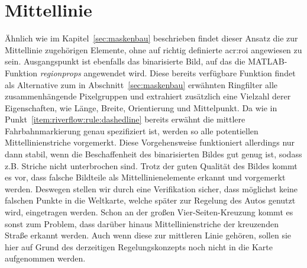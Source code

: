 \section{Mittellinie \dcfirstauthorshort}
\label{ssec:fahrspurerkennung:riverflow:mittellinie}
Ähnlich wie im Kapitel~\ref{sec:maskenbau} beschrieben findet dieser Ansatz die zur Mittellinie zugehörigen Elemente, ohne auf richtig definierte \gls{acr:roi} angewiesen zu sein. Ausgangspunkt ist ebenfalls das binarisierte Bild, auf das die MATLAB-Funktion \emph{regionprops} angewendet wird. Diese bereits verfügbare Funktion findet als Alternative zum in Abschnitt~\ref{sec:maskenbau} erwähnten \glqq Ringfilter\grqq{} alle zusammenhängende Pixelgruppen und extrahiert zusätzlich eine Vielzahl derer Eigenschaften, wie Länge, Breite, Orientierung und Mittelpunkt. Da wie in Punkt~\ref{item:riverflow:rule:dashedline} bereits erwähnt die mittlere Fahrbahnmarkierung genau spezifiziert ist, werden so alle potentiellen Mittellinienstriche vorgemerkt. Diese Vorgehensweise funktioniert allerdings nur dann stabil, wenn die Beschaffenheit des binarisierten Bildes gut genug ist, sodass z.B. Striche nicht unterbrochen sind. Trotz der guten Qualität des Bildes kommt es vor, dass falsche Bildteile als Mittellinienelemente erkannt und vorgemerkt werden. Deswegen stellen wir durch eine Verifikation sicher, dass möglichst keine falschen Punkte in die Weltkarte, welche später zur Regelung des Autos genutzt wird, eingetragen werden. Schon an der großen Vier-Seiten-Kreuzung kommt es sonst zum Problem, dass darüber hinaus Mittellinienstriche der kreuzenden Straße erkannt werden. Auch wenn diese zur mittleren Linie gehören, sollen sie hier auf Grund des derzeitigen Regelungskonzepts noch nicht in die Karte aufgenommen werden. 
